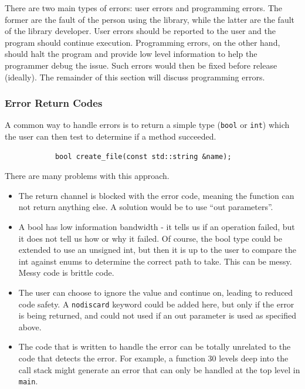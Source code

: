 \documentclass[12pt]{report}
\theoremstyle{definition}
\begin{document}
        There are two main types of errors: user errors and programming errors.
        The former are the fault of the person using the library, while the
        latter are the fault of the library developer. User errors should be
        reported to the user and the program should continue execution.
        Programming errors, on the other hand, should halt the program and
        provide low level information to help the programmer debug the
        issue. Such errors would then be fixed before release (ideally). The
        remainder of this section will discuss programming errors. \\

        \subsubsection{Error Return Codes}

          A common way to handle errors is to return a simple type (\texttt{bool} or \texttt{int})
          which the user can then test to determine if a method succeeded.

          \vspace{5mm}
          \begin{lstlisting}
            bool create_file(const std::string &name);
          \end{lstlisting}
          \vspace{5mm}

          There are many problems with this approach.

          \begin{itemize}
            \item The return channel is blocked with the error code, meaning
              the function can not return anything else. A solution would be to
              use ``out parameters''.
            \item A bool has low information bandwidth - it tells us if an
              operation failed, but it does not tell us how or why it failed.
              Of course, the bool type could be extended to use an unsigned int,
              but then it is up to the user to compare the int against enums to
              determine the correct path to take. This can be messy. Messy code
              is brittle code.
            \item The user can choose to ignore the value and continue on,
              leading to reduced code safety. A \texttt{nodiscard} keyword could be
              added here, but only if the error is being returned, and could not used
              if an out parameter is used as specified above.
            \item The code that is written to handle the error can be totally
              unrelated to the code that detects the error. For example, a
              function 30 levels deep into the call stack might generate an
              error that can only be handled at the top level in \texttt{main}.
          \end{itemize}
\end{document}
